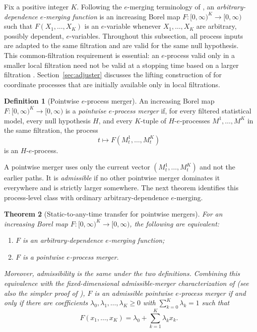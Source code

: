 \documentclass[11pt]{article}
\numberwithin{equation}{section}
\theoremstyle{plain}
\newtheorem{theorem}{Theorem}[section]
\theoremstyle{definition}
\newtheorem{definition}[theorem]{Definition}
\begin{document}
Fix a positive integer $K$. Following the $e$-merging terminology of \citet{VovkWang2021,Wang2025Merging}, an \emph{arbitrary-dependence $e$-merging function} is an increasing Borel map $F:[0,\infty)^K\to[0,\infty)$ such that $F(X_1,\ldots,X_K)$ is an $e$-variable whenever $X_1,\ldots,X_K$ are arbitrary, possibly dependent, $e$-variables. Throughout this subsection, all process inputs are adapted to the same filtration and are valid for the same null hypothesis. This common-filtration requirement is essential: an $e$-process valid only in a smaller local filtration need not be valid at a stopping time based on a larger filtration \citep{WangDandapanthulaRamdas2025}. Section~\ref{sec:adjuster} discusses the lifting construction of \citet{ChoeRamdas2026} for coordinate processes that are initially available only in local filtrations.

\begin{definition}[Pointwise $e$-process merger]\label{def:process-merger}
An increasing Borel map $F:[0,\infty)^K\to[0,\infty)$ is a \emph{pointwise $e$-process merger} if, for every filtered statistical model, every null hypothesis $H$, and every $K$-tuple of $H$-$e$-processes $M^1,\ldots,M^K$ in the same filtration, the process
\begin{equation}\label{eq:pointwise-process-merger}
  t\longmapsto F(M_t^1,\ldots,M_t^K)
\end{equation}
is an $H$-$e$-process.
\end{definition}

A pointwise merger uses only the current vector $(M_t^1,\ldots,M_t^K)$ and not the earlier paths. It is \emph{admissible} if no other pointwise merger dominates it everywhere and is strictly larger somewhere. The next theorem identifies this process-level class with ordinary arbitrary-dependence $e$-merging.

\begin{theorem}[Static-to-any-time transfer for pointwise mergers]\label{thm:process-merger-equivalence}
For an increasing Borel map $F:[0,\infty)^K\to[0,\infty)$, the following are equivalent:
\begin{enumerate}
\item[(i)] $F$ is an arbitrary-dependence $e$-merging function;
\item[(ii)] $F$ is a pointwise $e$-process merger.
\end{enumerate}
Moreover, admissibility is the same under the two definitions. Combining this equivalence with the fixed-dimensional admissible-merger characterization of \citet{Wang2025Merging} (see also the simpler proof of \citet{Clerico2026Merging}), $F$ is an admissible pointwise $e$-process merger if and only if there are coefficients $\lambda_0,\lambda_1,\ldots,\lambda_K\geq0$ with $\sum_{k=0}^K\lambda_k=1$ such that
\begin{equation}\label{eq:wang-process-form}
  F(x_1,\ldots,x_K)=\lambda_0+\sum_{k=1}^K\lambda_kx_k.
\end{equation}
\end{theorem}
\end{document}
